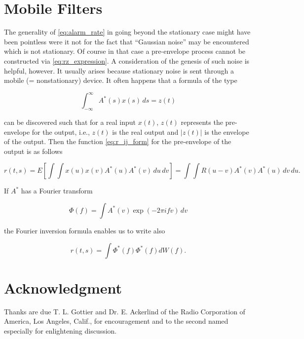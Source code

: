 \documentclass[10pt,twocolumn]{article}
\theoremstyle{definition}
\begin{document}
\section{Mobile Filters}

The generality of \eqref{eq:alarm_rate} in going beyond the stationary case might have been pointless were it not for the fact that ``Gaussian noise'' may be encountered which is not stationary. Of course in that case a pre-envelope process cannot be constructed via \eqref{eq:rz_expression}. A consideration of the genesis of such noise is helpful, however. It usually arises because stationary noise is sent through a mobile (= nonstationary) device. It often happens that a formula of the type

\begin{equation}
\label{eq:formula_type}
\int_{-\infty}^{\infty} A^*(s)x(s) \, ds = z(t)
\end{equation}

can be discovered such that for a real input $x(t)$, $z(t)$ represents the pre-envelope for the output, i.e., $z(t)$ is the real output and $|z(t)|$ is the envelope of the output. Then the function \eqref{eq:r_ij_form} for the pre-envelope of the output is as follows

\begin{equation}
\label{eq:r_output}
r(t, s) = E \left[\int\int x(u)x(v) A^*(u) A^*(v) \, du \, dv\right] = \int\int R(u - v) A^*(v) A^*(u) \, dv \, du.
\end{equation}

If $A^*$ has a Fourier transform

\begin{equation}
\label{eq:fourier_transform}
\Phi(f) = \int A^*(v) \exp (-2\pi ifv) \, dv
\end{equation}

the Fourier inversion formula enables us to write also

\begin{equation}
\label{eq:fourier_inversion}
r(t, s) = \int \Phi^*(f)\Phi^*(f) dW(f).
\end{equation}

\section*{Acknowledgment}
Thanks are due T. L. Gottier and Dr. E. Ackerlind of the Radio Corporation of America, Los Angeles, Calif., for encouragement and to the second named especially for enlightening discussion.
\end{document}
